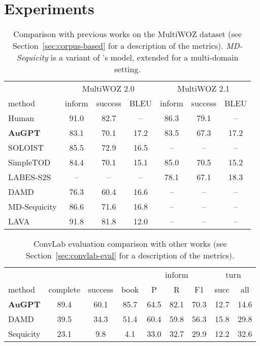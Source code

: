 \documentclass[11pt]{article}
\newcommand{\Augpt}[0]{AuGPT\xspace}
\begin{document}
\section{Experiments}
\label{sec:experiments}
\begin{table*}[htbp]
    \centering \small
    \begin{tabular}{l|ccc|ccc}
      \toprule
      & \multicolumn{3}{c|}{MultiWOZ 2.0} & \multicolumn{3}{c}{MultiWOZ 2.1} \\
      method & inform & success & BLEU & inform & success & BLEU \\
      \midrule
      Human & 91.0 & 82.7 & -- & 86.3 & 79.1 & -- \\
      \midrule
      \textbf{\Augpt} & 83.1 & 70.1 & 17.2 & 83.5 & 67.3 & 17.2 \\
      SOLOIST \cite{peng2020} & 85.5 & 72.9 & 16.5 & -- & -- & -- \\
      SimpleTOD \cite{hosseini2020} & 84.4 & 70.1 & 15.1 & 85.0 & 70.5 & 15.2 \\
      LABES-S2S \cite{zhang2020end2end} & -- & -- & -- & 78.1 & 67.1 & 18.3 \\
      DAMD \cite{zhang2019} & 76.3 & 60.4 & 16.6 & -- & -- & -- \\
      MD-Sequicity \cite{zhang2019} & 86.6 & 71.6 & 16.8 & -- & -- & -- \\
      LAVA \cite{lubis-etal-2020-lava} & 91.8 & 81.8 & 12.0 & -- & -- & -- \\
      \bottomrule
  \end{tabular}
  \caption{Comparison with previous works on the MultiWOZ dataset (see Section~\ref{sec:corpus-based} for a description of the metrics). \emph{MD-Sequicity} is a variant of \citet{lei2018}'s model, extended for a multi-domain setting.}
  \label{tab:multiwoz_sota_comparison}
\end{table*}
\begin{table*}[htbp]
    \centering \small
    \begin{tabular}{l|ccc|ccc|cc}
      \toprule
       &  & & & \multicolumn{3}{c|}{inform} & \multicolumn{2}{c}{turn} \\
      method & complete & success & book & P & R & F1 & succ & all \\
      \midrule
      \textbf{\Augpt} & 89.4 & 60.1 & 85.7 & 64.5 & 82.1 & 70.3 & 12.7 & 14.6 \\
      DAMD \cite{zhang2019} & 39.5 & 34.3 & 51.4 & 60.4 & 59.8 & 56.3 & 15.8 & 29.8\\
      Sequicity \cite{lei2018} & 23.1 & \phantom{0}9.8 & \phantom{0}4.1 & 33.0 & 32.7 & 29.9 & 12.2 & 32.6 \\
      \bottomrule
  \end{tabular}
  \caption{ConvLab evaluation comparison with other works (see Section~\ref{sec:convlab-eval} for a description of the metrics).}
  \label{tab:multiwoz_convlab_comparison}
\end{table*}
\end{document}
